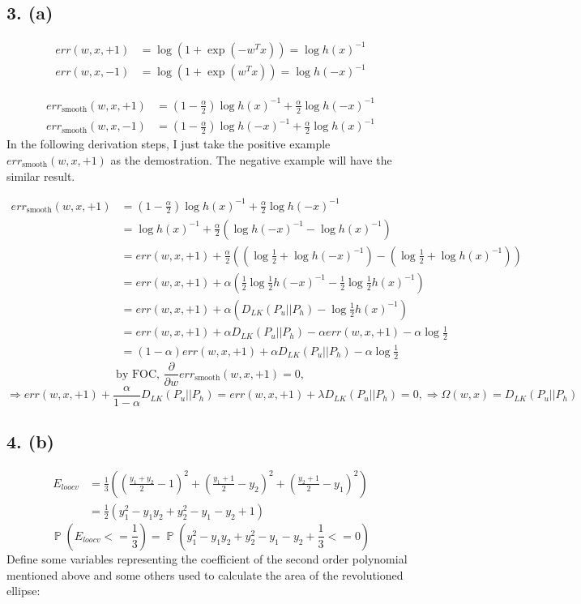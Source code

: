 \documentclass[12pt,a4paper]{article}
\DeclareMathOperator{\Prob}{\mathbb{P}}
\begin{document}
\subsection{3. (a)}

\begin{align}
    err(w, x, +1) &= \log(1+\exp(-w^Tx)) = \log{h(x)^{-1}} \\
    err(w, x, -1) &= \log(1+\exp(w^Tx)) = \log{h(-x)^{-1}}
\end{align}

\begin{align}
    err_{\text{smooth}}(w, x, +1) &= (1-\frac{\alpha}{2})\log{h(x)^{-1}} + \frac{\alpha}{2}\log{h(-x)^{-1}} \\
    err_{\text{smooth}}(w, x, -1) &= (1-\frac{\alpha}{2})\log{h(-x)^{-1}} + \frac{\alpha}{2}\log{h(x)}^{-1}
\end{align}
In the following derivation steps, I just take the positive example $err_{\text{smooth}}(w, x, +1)$ as the demostration. The negative example  will have the similar result.

\[
\begin{split}
    err_{\text{smooth}}(w, x, +1) 
    &= (1-\frac{\alpha}{2})\log{h(x)^{-1}} + \frac{\alpha}{2}\log{h(-x)^{-1}} \\
    &= \log{h(x)^{-1}} + \frac{\alpha}{2}(\log{h(-x)^{-1}} - \log{h(x)^{-1}}) \\
    &= err(w, x, +1) + \frac{\alpha}{2} ( (\log{\frac{1}{2}} + \log{h(-x)^{-1}}) - (\log{\frac{1}{2}} + \log{h(x)^{-1}}) ) \\
    &= err(w, x, +1) + \alpha ( \frac{1}{2} \log{\frac{1}{2} h(-x)^{-1}} - \frac{1}{2} \log{\frac{1}{2} h(x)^{-1}} ) \\
    &= err(w, x, +1) + \alpha ( D_{LK}(P_u||P_h) - \log{\frac{1}{2} h(x)^{-1}} ) \\ 
    &= err(w, x, +1) + \alpha D_{LK}(P_u||P_h) - \alpha err(w, x, +1) - \alpha \log{\frac{1}{2}} \\
    &= (1-\alpha) err(w, x, +1) + \alpha D_{LK}(P_u||P_h) - \alpha \log{\frac{1}{2}}
\end{split}
\]
\[
\text{by FOC, } \frac{\partial}{\partial w} err_{\text{smooth}}(w, x, +1) = 0, 
\]
\[
\Rightarrow  err(w, x, +1) + \frac{\alpha}{1-\alpha} D_{LK}(P_u||P_h) = err(w, x, +1) + \lambda D_{LK}(P_u||P_h) = 0, 
\Rightarrow \Omega(w, x) = D_{LK}(P_u||P_h)
\]
\subsection{4. (b)}
\[
\begin{split}
    E_{loocv} 
    &= \frac{1}{3} ( (\frac{y_1+y_2}{2} - 1)^2 + (\frac{y_1+1}{2} - y_2)^2 + (\frac{y_2+1}{2} - y_1)^2 ) \\
    &= \frac{1}{2} (y_1^2 -y_1y_2 + y_2^2 - y_1 - y_2 + 1)
\end{split}
\]
\[
\Prob (E_{loocv} <= \frac{1}{3}) = \Prob (y_1^2 -y_1y_2 + y_2^2 - y_1 - y_2 + \frac{1}{3} <= 0)
\]
Define some variables representing the coefficient of the second order polynomial mentioned above and some others used to calculate the area of the revolutioned ellipse:
\end{document}
